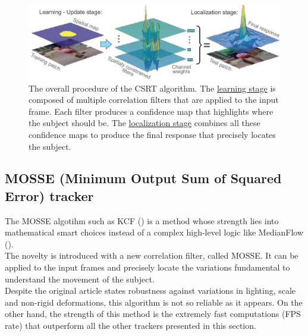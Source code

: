 \begin{figure}[!h]
	\centering
	\includegraphics[width=1\linewidth]{images/tracking/howItWorks_CSRT}
	\captionsetup{margin=0.5cm}
	\caption[The general intuition of the CSRT algorithm.]{The overall procedure of the CSRT algorithm. The \underline{learning stage} is composed of multiple correlation filters that are applied to the input frame. Each filter produces a confidence map that highlights where the subject should be. The \underline{localization stage} combines all these confidence maps to produce the final response that precisely locates the subject.}
	\label{fig:howItWorks_CSRT}
\end{figure}


\subsection{MOSSE (Minimum Output Sum of Squared Error) tracker}
The MOSSE algotihm\cite{mosse} such as KCF () is a method whose strength lies into mathematical smart choices instead of a complex high-level logic like MedianFlow ().\\
The novelty is introduced with a new correlation filter, called MOSSE. It can be applied to the input frames and precisely locate the variations fundamental to understand the movement of the subject.\\
Despite the original article states robustness against variations in lighting, scale and non-rigid deformations, this algorithm is not so reliable as it appears. On the other hand, the strength of this method is the extremely fast computations (FPS rate) that outperform all the other trackers presented in this section.

